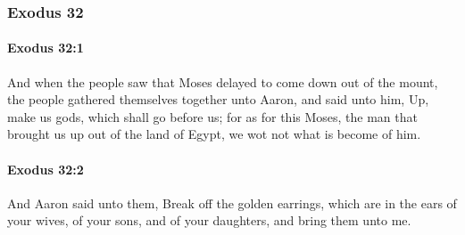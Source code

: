 	\subsubsection{Exodus 32} %
		\label{EXODUS-32}

		\paragraph{Exodus 32:1} %
			\label{EXODUS-32-1}

			And when the people saw that Moses delayed to come down out of the mount, the people gathered themselves together unto Aaron, and said unto him, Up, make us gods, which shall go before us; for as for this Moses, the man that brought us up out of the land of Egypt, we wot not what is become of him.


		\paragraph{Exodus 32:2} %
			\label{EXODUS-32-2}

			And Aaron said unto them, Break off the golden earrings, which are in the ears of your wives, of your sons, and of your daughters, and bring them unto me.

